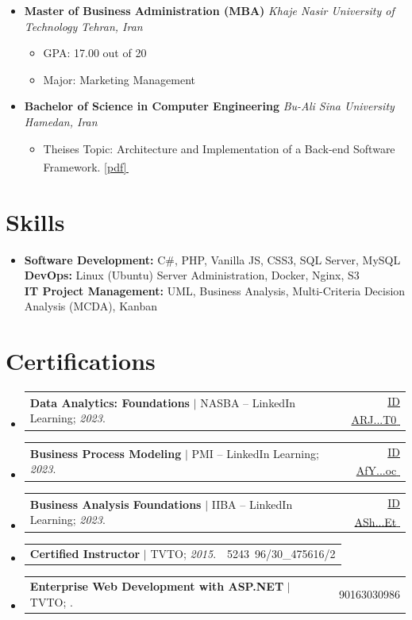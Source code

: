 \documentclass[11pt,a4paper]{article}
\makeatletter
\let\orighref\href
\renewcommand{\href}[2]{\orighref{#1}{#2\,{\textsuperscript{\tiny{\textcolor{heritagered}{\faExternalLink}}}}}}
\newcommand{\deemph}[1]{{\color{gray}#1}}
\newcommand{\resumeItem}[1]{
  \item\small{
    {#1 \vspace{-2pt}}
  }
}
\newcommand{\resumeSubheading}[4]{
  \vspace{-2pt}\item
      \textbf{#1} \small\deemph{#2}
      \textit{\small #3} \hfill \textit{\small\deemph{\textcolor{marineblue}{#4}}}
    \vspace{0pt}
}
\newcommand{\resumeProjectHeading}[2]{
    \item
    \begin{tabular*}{0.97\textwidth}{l@{\extracolsep{\fill}}r}
      \small#1 & \deemph{#2} \\
    \end{tabular*}\vspace{-7pt}
}
\newcommand{\resumeSubHeadingListStart}{\begin{itemize}[leftmargin=0.15in, label={}]}
\newcommand{\resumeSubHeadingListEnd}{\end{itemize}}
\newcommand{\resumeItemListStart}{\begin{itemize}}
\newcommand{\resumeItemListEnd}{\end{itemize}\vspace{-5pt}}
\makeatother
\begin{document}
  \resumeSubHeadingListStart
    \resumeSubheading
        {Master of Business Administration (MBA)}{}{Khaje Nasir University of Technology}{Tehran, Iran}
        \resumeItemListStart
            \resumeItem{GPA: 17.00 out of 20}
            \resumeItem{Major: Marketing Management}
          \resumeItemListEnd
          
    \resumeSubheading
      {Bachelor of Science in Computer Engineering}{}{Bu-Ali Sina University}{Hamedan, Iran}
      \resumeItemListStart
            \resumeItem{Theises Topic: Architecture and Implementation of a Back-end Software Framework. \href{https://github.com/tayyebi/BASU-Final-Project-BSc/blob/master/payan.pdf}{[pdf]}}
          \resumeItemListEnd

  \resumeSubHeadingListEnd

\section{Skills}
 \begin{itemize}[leftmargin=0.15in, label={}]
    \item {
        \textbf{Software Development:}
        C\#, PHP, Vanilla JS, CSS3, SQL Server, MySQL
        \\
        \textbf{DevOps:}
        Linux (Ubuntu) Server Administration, Docker, Nginx, S3 
        \\
        \textbf{IT Project Management:}
        {UML},
        {Business Analysis},
        {Multi-Criteria Decision Analysis (MCDA)},
        {Kanban}
    }
     
 \end{itemize}

\section{Certifications}
    \resumeSubHeadingListStart
      \resumeProjectHeading
          {\textbf{Data Analytics: Foundations} $|$ NASBA -- LinkedIn Learning; \emph{2023}.}{\href{https://www.linkedin.com/learning/certificates/10c24841aac6b0c139f4971a8efd6d10356dc105124e31fa10eb32aa14ce3392}{\deemph{ID} \small{ARJ...T0}}}
      \resumeProjectHeading
          {\textbf{Business Process Modeling} $|$ PMI -- LinkedIn Learning; \emph{2023}.}{\href{https://www.linkedin.com/learning/certificates/3d1e244d9234631a908175486d19855434634d7f61cec316326ba4eb269bb041}{\deemph{ID} \small{AfY...oc}}}
      \resumeProjectHeading
          {\textbf{Business Analysis Foundations} $|$ IIBA -- LinkedIn Learning; \emph{2023}.}{\href{https://www.linkedin.com/learning/certificates/51dd265ef63b58255245c8f7438549551c92d30031e81b9ad864ee6994e1f6e6}{\deemph{ID} \small{ASh...Et}}}
       \resumeProjectHeading
           {\textbf{Certified Instructor} $|$ TVTO; \emph{2015}.}{\deemph{Contract No.} 5243\, 96/30\_475616/2}
     \resumeProjectHeading
           {\textbf{Enterprise Web Development with ASP.NET} $|$ TVTO; \emph{\highlight{2013}}.}{\deemph{No.} 90163030986}
    \resumeSubHeadingListEnd
\end{document}
